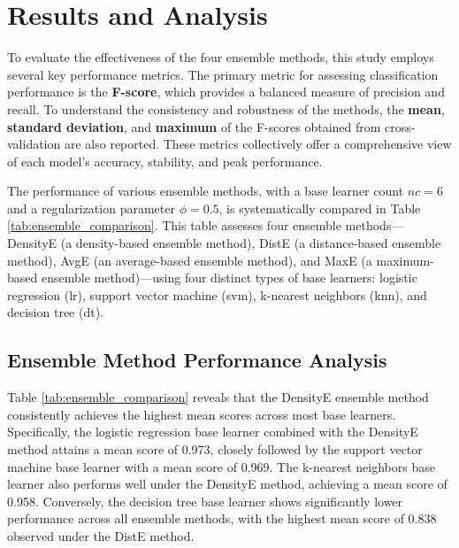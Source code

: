 \documentclass[lettersize,journal]{IEEEtran}
\begin{document}
	\section{Results and Analysis}
	
	\noindent To evaluate the effectiveness of the four ensemble methods, this study employs several key performance metrics. The primary metric for assessing classification performance is the \textbf{F-score}, which provides a balanced measure of precision and recall. To understand the consistency and robustness of the methods, the \textbf{mean}, \textbf{standard deviation}, and \textbf{maximum} of the F-scores obtained from cross-validation are also reported. These metrics collectively offer a comprehensive view of each model's accuracy, stability, and peak performance.
	
	\noindent The performance of various ensemble methods, with a base learner count $nc = 6$ and a regularization parameter $\phi = 0.5$, is systematically compared in Table \ref{tab:ensemble_comparison}. This table assesses four ensemble methods—DensityE (a density-based ensemble method), DistE (a distance-based ensemble method), AvgE (an average-based ensemble method), and MaxE (a maximum-based ensemble method)—using four distinct types of base learners: logistic regression (lr), support vector machine (svm), k-nearest neighbors (knn), and decision tree (dt).
	
	\subsection{Ensemble Method Performance Analysis}
	
	\noindent Table \ref{tab:ensemble_comparison} reveals that the DensityE ensemble method consistently achieves the highest mean scores across most base learners. Specifically, the logistic regression base learner combined with the DensityE method attains a mean score of 0.973, closely followed by the support vector machine base learner with a mean score of 0.969. The k-nearest neighbors base learner also performs well under the DensityE method, achieving a mean score of 0.958.
	Conversely, the decision tree base learner shows significantly lower performance across all ensemble methods, with the highest mean score of 0.838
	observed under the DistE method.
	
	\setlength{\tabcolsep}{2pt} %
	
\end{document}
